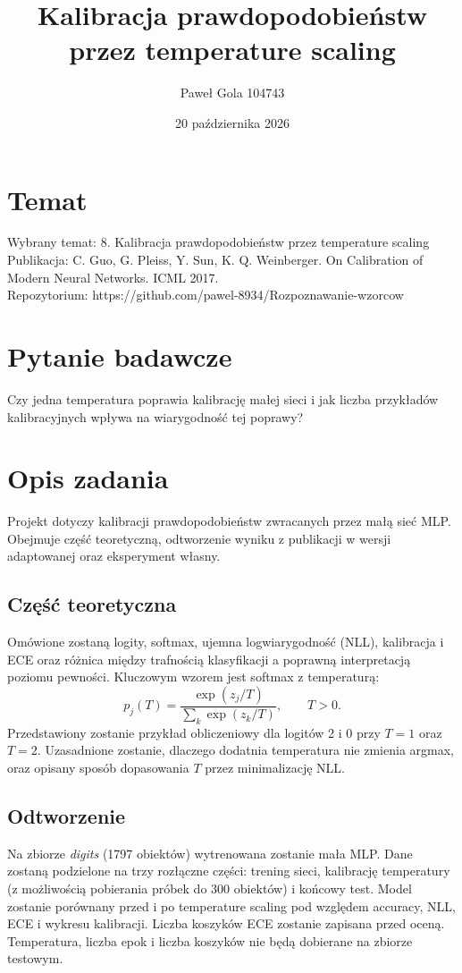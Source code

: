 \documentclass[10pt,a4paper]{article}
\begin{document}
\title{Kalibracja prawdopodobieństw przez temperature scaling}
\author{Paweł Gola 104743}
\date{20 października 2026}

\maketitle

\section{Temat}
\noindent
Wybrany temat: 8. Kalibracja prawdopodobieństw przez temperature scaling
\\
Publikacja: C. Guo, G. Pleiss, Y. Sun, K. Q. Weinberger. On Calibration of Modern Neural Networks. ICML 2017.
\\
Repozytorium: https://github.com/pawel-8934/Rozpoznawanie-wzorcow

\section{Pytanie badawcze}

Czy jedna temperatura poprawia kalibrację małej sieci i jak liczba przykładów kalibracyjnych wpływa na wiarygodność tej poprawy?

\section{Opis zadania}

Projekt dotyczy kalibracji prawdopodobieństw zwracanych przez małą sieć MLP. Obejmuje część teoretyczną, odtworzenie wyniku z publikacji w wersji adaptowanej oraz eksperyment własny.

\subsection{Część teoretyczna}
Omówione zostaną logity, softmax, ujemna logwiarygodność (NLL), kalibracja i ECE oraz różnica między trafnością klasyfikacji a poprawną interpretacją poziomu pewności. Kluczowym wzorem jest softmax z temperaturą:
\[
    p_j(T) = \frac{\exp{(z_j/T)}}{\sum_k \exp(z_k/T)}, \qquad T > 0.
\]
Przedstawiony zostanie przykład obliczeniowy dla logitów 2 i 0 przy $T=1$ oraz $T=2$. Uzasadnione zostanie, dlaczego dodatnia temperatura nie zmienia argmax, oraz opisany sposób dopasowania $T$ przez minimalizację NLL.

\subsection{Odtworzenie}
Na zbiorze \emph{digits} (1797 obiektów) wytrenowana zostanie mała MLP. Dane zostaną podzielone na trzy rozłączne części: trening sieci, kalibrację temperatury (z możliwością pobierania próbek do 300 obiektów) i końcowy test. Model zostanie porównany przed i po temperature scaling pod względem accuracy, NLL, ECE i wykresu kalibracji. Liczba koszyków ECE zostanie zapisana przed oceną. Temperatura, liczba epok i liczba koszyków nie będą dobierane na zbiorze testowym.
\end{document}
